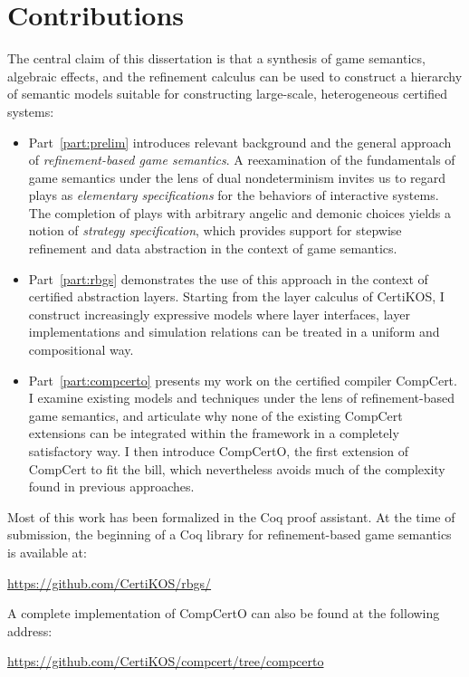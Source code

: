 \documentclass[11pt,oneside,draft]{book}
\theoremstyle{definition}
\begin{document}
\section{Contributions} %
\label{ssec:contrib}

The central claim of this dissertation is that a synthesis
of %
game semantics, algebraic effects, and the refinement calculus
can be used to construct a hierarchy of semantic models
suitable for constructing large-scale, heterogeneous certified systems:
\begin{itemize}
  \item
    Part~\ref{part:prelim} introduces relevant background
    and the general approach of
    \emph{refinement-based game semantics}.
    A reexamination of the fundamentals of game semantics
    under the lens of dual nondeterminism
    invites us to regard plays as \emph{elementary specifications}
    for the behaviors of interactive systems.
    The completion of plays
    with arbitrary angelic and demonic choices
    yields a notion of \emph{strategy specification},
    which provides support for
    stepwise refinement and data abstraction
    in the context of game semantics.
  \item
    Part~\ref{part:rbgs} demonstrates the use of this approach
    in the context of certified abstraction layers.
    Starting from the layer calculus of CertiKOS,
    I construct increasingly expressive models
    where layer interfaces, layer implementations and
    simulation relations
    can be treated in a uniform and compositional way.
  \item
    Part~\ref{part:compcerto}
    presents my work on the certified compiler CompCert.
    I examine existing models and techniques
    under the lens of refinement-based game semantics,
    and articulate why none of the existing
    CompCert extensions can be integrated within
    the framework in a completely satisfactory way.
    I then introduce CompCertO,
    the first extension of CompCert to fit the bill,
    which nevertheless avoids much of the complexity
    found in previous approaches.
\end{itemize}

Most of this work has been formalized in the Coq proof assistant.
At the time of submission,
the beginning of a Coq library
for refinement-based game semantics
is available at:
\begin{center}
  \url{https://github.com/CertiKOS/rbgs/}
\end{center}
A complete implementation of CompCertO
can also be found at the following address:
\begin{center}
  \url{https://github.com/CertiKOS/compcert/tree/compcerto}
\end{center}
\end{document}
